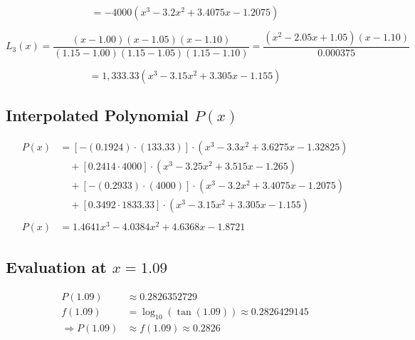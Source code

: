 \documentclass[legalpaper,11pt,extrafontsizes,oneside,openany,x11names]{memoir}
\begin{document}
\[
= -4000(x^3 - 3.2x^2 + 3.4075x - 1.2075)
\]

\[
L_3(x) = \frac{(x - 1.00)(x - 1.05)(x - 1.10)}{(1.15 - 1.00)(1.15 - 1.05)(1.15 - 1.10)} = \frac{(x^2 - 2.05x + 1.05)(x - 1.10)}{0.000375}
\]

\[
= 1,333.33(x^3 - 3.15x^2 + 3.305x - 1.155) 
\]

\subsection*{Interpolated Polynomial $P(x)$}

\begin{align*}
P(x) &= [-(0.1924) \cdot (133.33)] \cdot (x^3 - 3.3x^2 + 3.6275x - 1.32825) \\
&\quad + [0.2414 \cdot 4000] \cdot (x^3 - 3.25x^2 + 3.515x - 1.265) \\
&\quad + [-(0.2933) \cdot (4000)] \cdot (x^3 - 3.2x^2 + 3.4075x - 1.2075) \\
&\quad + [0.3492 \cdot 1833.33] \cdot (x^3 - 3.15x^2 + 3.305x - 1.155) \\
\\
P(x) &= 1.4641x^3 - 4.0384x^2 + 4.6368x - 1.8721
\end{align*}

\subsection*{Evaluation at $x = 1.09$}

\begin{align*}
P(1.09) &\approx 0.2826352729 \\
f(1.09) &= \log_{10}(\tan(1.09)) \approx 0.2826429145 \\
\Rightarrow P(1.09) &\approx f(1.09) \approx \boxed{0.2826}
\end{align*}
\end{document}
